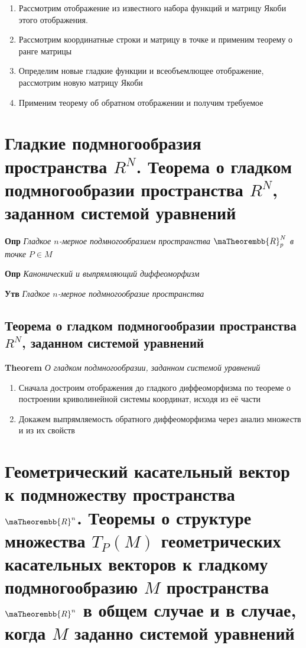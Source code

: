 \documentclass[a4paper, 14pt]{article}
\begin{document}
    \begin{enumerate}
        \item Рассмотрим отображение из известного набора функций и матрицу Якоби этого отображения.
        \item Рассмотрим координатные строки и матрицу в точке и применим теорему о ранге матрицы
        \item Определим новые гладкие функции и всеобъемлющее отображение, рассмотрим новую матрицу Якоби
        \item Применим теорему об обратном отображении и получим требуемое
    \end{enumerate}
    
    \section{Гладкие подмногообразия пространства $R^N$.
    Теорема о гладком подмногообразии пространства $R^N$, заданном системой уравнений}
    
    \textbf{Опр} \textit{Гладкое $n$-мерное подмногообразием пространства $\maTheorembb{R}^N_p$ в точке $P \in M$}
    
    \textbf{Опр} \textit{Канонический и выпрямляющий диффеоморфизм}
    
    \textbf{Утв} \textit{Гладкое $n$-мерное подмногообразие пространства}
    
    \subsection{Теорема о гладком подмногообразии пространства $R^N$, заданном системой уравнений}
    
    \textbf{Theorem} \textit{О гладком подмногообразии, заданном системой уравнений}
    
    \begin{enumerate}
        \item Сначала достроим отображения до гладкого диффеоморфизма по теореме о построении криволинейной системы
        координат, исходя из её части
        \item Докажем выпрямляемость обратного диффеоморфизма через анализ множеств и из их свойств
    \end{enumerate}
    
    \section{Геометрический касательный вектор к подмножеству пространства $\maTheorembb{R}^n$.
    Теоремы о структуре множества $T_P (M)$ геометрических касательных векторов к гладкому подмногообразию $M$
        пространства $\maTheorembb{R}^n$ в общем случае и в случае, когда $M$ заданно системой уравнений}
    
\end{document}
